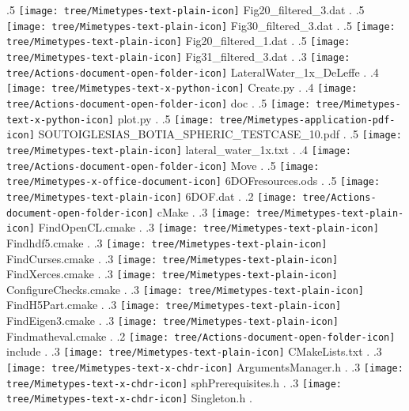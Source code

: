 {.5 { \texttt{[image: tree/Mimetypes-text-plain-icon]} Fig20\_filtered\_3.dat }.
.5 { \texttt{[image: tree/Mimetypes-text-plain-icon]} Fig30\_filtered\_3.dat }.
.5 { \texttt{[image: tree/Mimetypes-text-plain-icon]} Fig20\_filtered\_1.dat }.
.5 { \texttt{[image: tree/Mimetypes-text-plain-icon]} Fig31\_filtered\_3.dat }.
.3 { \texttt{[image: tree/Actions-document-open-folder-icon]} LateralWater\_1x\_DeLeffe }.
.4 { \texttt{[image: tree/Mimetypes-text-x-python-icon]} Create.py }.
.4 { \texttt{[image: tree/Actions-document-open-folder-icon]} doc }.
.5 { \texttt{[image: tree/Mimetypes-text-x-python-icon]} plot.py }.
.5 { \texttt{[image: tree/Mimetypes-application-pdf-icon]} SOUTOIGLESIAS\_BOTIA\_SPHERIC\_TESTCASE\_10.pdf }.
.5 { \texttt{[image: tree/Mimetypes-text-plain-icon]} lateral\_water\_1x.txt }.
.4 { \texttt{[image: tree/Actions-document-open-folder-icon]} Move }.
.5 { \texttt{[image: tree/Mimetypes-x-office-document-icon]} 6DOFresources.ods }.
.5 { \texttt{[image: tree/Mimetypes-text-plain-icon]} 6DOF.dat }.
.2 { \texttt{[image: tree/Actions-document-open-folder-icon]} cMake }.
.3 { \texttt{[image: tree/Mimetypes-text-plain-icon]} FindOpenCL.cmake }.
.3 { \texttt{[image: tree/Mimetypes-text-plain-icon]} Findhdf5.cmake }.
.3 { \texttt{[image: tree/Mimetypes-text-plain-icon]} FindCurses.cmake }.
.3 { \texttt{[image: tree/Mimetypes-text-plain-icon]} FindXerces.cmake }.
.3 { \texttt{[image: tree/Mimetypes-text-plain-icon]} ConfigureChecks.cmake }.
.3 { \texttt{[image: tree/Mimetypes-text-plain-icon]} FindH5Part.cmake }.
.3 { \texttt{[image: tree/Mimetypes-text-plain-icon]} FindEigen3.cmake }.
.3 { \texttt{[image: tree/Mimetypes-text-plain-icon]} Findmatheval.cmake }.
.2 { \texttt{[image: tree/Actions-document-open-folder-icon]} include }.
.3 { \texttt{[image: tree/Mimetypes-text-plain-icon]} CMakeLists.txt }.
.3 { \texttt{[image: tree/Mimetypes-text-x-chdr-icon]} ArgumentsManager.h }.
.3 { \texttt{[image: tree/Mimetypes-text-x-chdr-icon]} sphPrerequisites.h }.
.3 { \texttt{[image: tree/Mimetypes-text-x-chdr-icon]} Singleton.h }.
}
